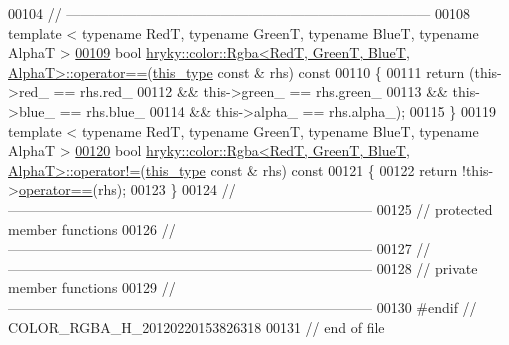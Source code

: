 \begin{DoxyCode}
00104 \textcolor{comment}{//
      ------------------------------------------------------------------------------}
00108 \textcolor{comment}{}\textcolor{keyword}{template} < \textcolor{keyword}{typename} RedT, \textcolor{keyword}{typename} GreenT, \textcolor{keyword}{typename} BlueT, \textcolor{keyword}{typename} AlphaT >
\hypertarget{color__rgba_8h_source_l00109}{}\hyperlink{classhryky_1_1color_1_1_rgba_aa2d8331197445f148dd54c6d568dc992}{00109} \textcolor{keywordtype}{bool} \hyperlink{classhryky_1_1color_1_1_rgba_aa2d8331197445f148dd54c6d568dc992}{hryky::color::Rgba<RedT, GreenT, BlueT, AlphaT>::operator==}(\hyperlink{classhryky_1_1color_1_1_rgba}{this_type} \textcolor{keyword}{
      const} & rhs)\textcolor{keyword}{ const}
00110 \textcolor{keyword}{}\{
00111     \textcolor{keywordflow}{return} (this->red\_ == rhs.red\_
00112             && this->green\_ == rhs.green\_
00113             && this->blue\_ == rhs.blue\_
00114             && this->alpha\_ == rhs.alpha\_);
00115 \}
00119 \textcolor{keyword}{template} < \textcolor{keyword}{typename} RedT, \textcolor{keyword}{typename} GreenT, \textcolor{keyword}{typename} BlueT, \textcolor{keyword}{typename} AlphaT >
\hypertarget{color__rgba_8h_source_l00120}{}\hyperlink{classhryky_1_1color_1_1_rgba_aed94d261780847d637b6ad511af43b3c}{00120} \textcolor{keywordtype}{bool} \hyperlink{classhryky_1_1color_1_1_rgba_aed94d261780847d637b6ad511af43b3c}{hryky::color::Rgba<RedT, GreenT, BlueT, AlphaT>::operator!=}(\hyperlink{classhryky_1_1color_1_1_rgba}{this_type} \textcolor{keyword}{
      const} & rhs)\textcolor{keyword}{ const}
00121 \textcolor{keyword}{}\{
00122     \textcolor{keywordflow}{return} !this->\hyperlink{namespacehryky_a96bfe0df0a09db56e7253330de4f2243}{operator==}(rhs);
00123 \}
00124 \textcolor{comment}{//
      ------------------------------------------------------------------------------}
00125 \textcolor{comment}{// protected member functions}
00126 \textcolor{comment}{//
      ------------------------------------------------------------------------------}
00127 \textcolor{comment}{//
      ------------------------------------------------------------------------------}
00128 \textcolor{comment}{// private member functions}
00129 \textcolor{comment}{//
      ------------------------------------------------------------------------------}
00130 \textcolor{preprocessor}{#endif // COLOR\_RGBA\_H\_20120220153826318}
00131 \textcolor{preprocessor}{}\textcolor{comment}{// end of file}
\end{DoxyCode}

